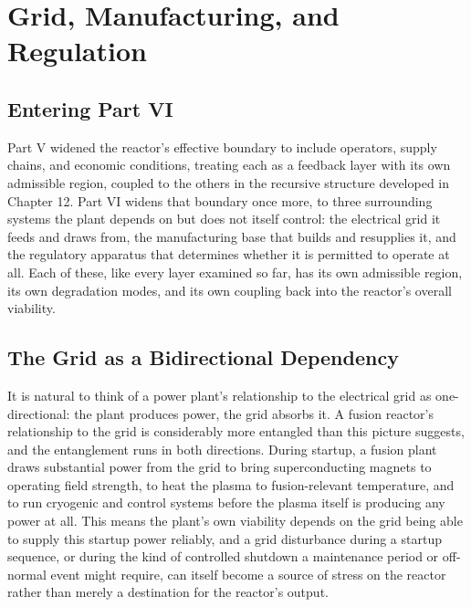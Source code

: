\chapter{Grid, Manufacturing, and Regulation}

\section{Entering Part VI}

Part V widened the reactor's effective boundary to include operators, supply chains, and economic conditions, treating each as a feedback layer with its own admissible region, coupled to the others in the recursive structure developed in Chapter 12. Part VI widens that boundary once more, to three surrounding systems the plant depends on but does not itself control: the electrical grid it feeds and draws from, the manufacturing base that builds and resupplies it, and the regulatory apparatus that determines whether it is permitted to operate at all. Each of these, like every layer examined so far, has its own admissible region, its own degradation modes, and its own coupling back into the reactor's overall viability.

\section{The Grid as a Bidirectional Dependency}

It is natural to think of a power plant's relationship to the electrical grid as one-directional: the plant produces power, the grid absorbs it. A fusion reactor's relationship to the grid is considerably more entangled than this picture suggests, and the entanglement runs in both directions. During startup, a fusion plant draws substantial power from the grid to bring superconducting magnets to operating field strength, to heat the plasma to fusion-relevant temperature, and to run cryogenic and control systems before the plasma itself is producing any power at all. This means the plant's own viability depends on the grid being able to supply this startup power reliably, and a grid disturbance during a startup sequence, or during the kind of controlled shutdown a maintenance period or off-normal event might require, can itself become a source of stress on the reactor rather than merely a destination for the reactor's output.


